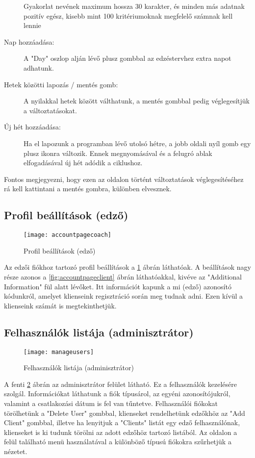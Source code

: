 \begin{description}
	Gyakorlat nevének maximum hossza 30 karakter, és minden más adatnak pozitív egész, kisebb mint 100 kritériumoknak megfelelő számnak kell lennie
	\item[Nap hozzáadása:] A "Day" oszlop alján lévő plusz gombbal az edzéstervhez extra napot adhatunk.
	\item[Hetek közötti lapozás / mentés gomb:]  A nyilakkal hetek között válthatunk, a mentés gombbal pedig véglegesítjük a változtatásokat.
	\item[Új hét hozzáadása:] Ha el lapozunk a programban lévő utolsó hétre, a jobb oldali nyíl gomb egy plusz ikonra változik. Ennek megnyomásával és a felugró ablak elfogadásával új hét adódik a ciklushoz. 
\end{description}

Fontos megjegyezni, hogy ezen az oldalon történt változtatások véglegesítéséhez rá kell kattintani a mentés gombra, különben elvesznek.

\subsection{Profil beállítások (edző)}

\begin{figure}[H]
	\centering
	\texttt{[image: accountpagecoach]}
	\caption{Profil beállítások (edző)}
	\label{fig:accountpagecoach}
\end{figure}

Az edzői fiókhoz tartozó profil beállítások a \ref{fig:accountpagecoach} ábrán láthatóak. A beállítások nagy része azonos a \ref{fig:accountpageclient} ábrán láthatóakkal, kivéve az "Additional Information" fül alatt lévőket. Itt információt kapunk a mi (edző) azonosító kódunkról, amelyet klienseink regisztráció során meg tudnak adni. Ezen kívül a klienseink számát is megtekinthetjük.

\subsection{Felhasználók listája (adminisztrátor)}

\begin{figure}[H]
	\centering
	\texttt{[image: manageusers]}
	\caption{Felhasználók listája (adminisztrátor)}
	\label{fig:manageusers}
\end{figure}

A fenti \ref{fig:manageusers} ábrán az adminisztrátor felület látható. Ez a felhasználók kezelésére szolgál. Információkat láthatunk a fiók típusárol, az egyéni azonosítójukról, valamint a csatlakozási dátum is fel van tűntetve. Felhasználói fiókokat törölhetünk a "Delete User" gombbal, klienseket rendelhetünk edzőkhöz az "Add Client" gombbal, illetve ha lenyitjuk a "Clients" listát egy edző felhasználónak, klienseket is ki tudunk törölni az adott edzőhöz tartozó listából. Az oldalon a felül található menü használatával a különböző típusú fiókokra szűrhetjük a nézetet.

